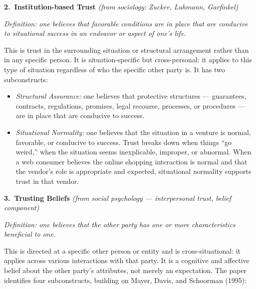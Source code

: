 \documentclass[11pt, a4paper]{article}
\begin{document}
\bigskip
\noindent\textbf{2.\ Institution-based Trust} \hfill \textit{(from sociology: Zucker, Luhmann, Garfinkel)}

\textit{Definition: one believes that favorable conditions are in place that are conducive to situational success in an endeavor or aspect of one's life.}

This is trust in the surrounding situation or structural arrangement rather than in any specific person. It is situation-specific but cross-personal: it applies to this type of situation regardless of who the specific other party is. It has two subconstructs:

\begin{itemize}[leftmargin=2em]
  \item \textit{Structural Assurance:} one believes that protective structures --- guarantees, contracts, regulations, promises, legal recourse, processes, or procedures --- are in place that are conducive to success.
  \item \textit{Situational Normality:} one believes that the situation in a venture is normal, favorable, or conducive to success. Trust breaks down when things ``go weird,'' when the situation seems inexplicable, improper, or abnormal. When a web consumer believes the online shopping interaction is normal and that the vendor's role is appropriate and expected, situational normality supports trust in that vendor.
\end{itemize}

\bigskip
\noindent\textbf{3.\ Trusting Beliefs} \hfill \textit{(from social psychology --- interpersonal trust, belief component)}

\textit{Definition: one believes that the other party has one or more characteristics beneficial to one.}

This is directed at a specific other person or entity and is cross-situational: it applies across various interactions with that party. It is a cognitive and affective belief about the other party's attributes, not merely an expectation. The paper identifies four subconstructs, building on Mayer, Davis, and Schoorman (1995):
\end{document}

